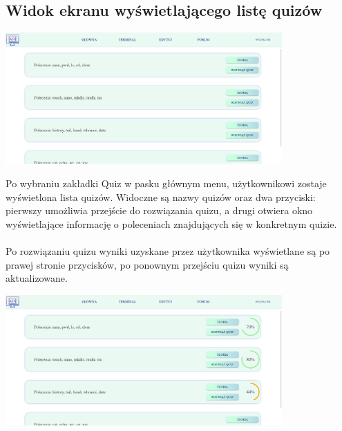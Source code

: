 \documentclass[10pt,a4paper]{report}
\begin{document}
\begin{adjustwidth}{2cm}{2cm}
\subsection{Widok ekranu wyświetlającego listę quizów}
\begin{minipage}{\linewidth}
\begin{center}
  \includegraphics[width=400px]{project/list_quiz.png}
\end{center}
\end{minipage}
\begin{minipage}{1\linewidth}
\vspace{0.3cm}
Po wybraniu zakładki Quiz  w pasku głównym menu, użytkownikowi zostaje wyświetlona lista quizów.
Widoczne są nazwy quizów oraz dwa przyciski: pierwszy umożliwia przejście do rozwiązania quizu, a drugi otwiera okno wyświetlające informację o poleceniach znajdujących się w konkretnym quizie.\\  \\
Po rozwiązaniu quizu wyniki uzyskane przez użytkownika wyświetlane są po prawej stronie przycisków, po ponownym przejściu quizu wyniki są aktualizowane. \\ 
\end{minipage}
\begin{minipage}{\linewidth}
\begin{center}
  \includegraphics[width=400px]{project/list_quiz2.png}

\end{center}
\end{minipage}
\end{adjustwidth}
\end{document}
